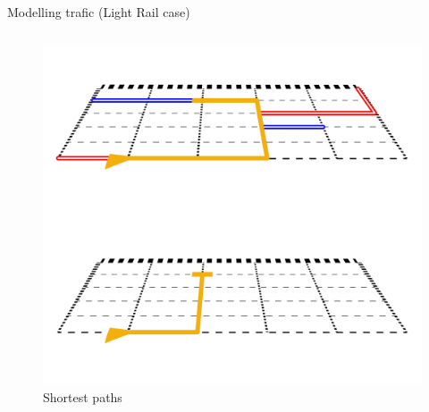 \documentclass{EESD}
\begin{document}
\begin{frame}{Modelling trafic (Light Rail case)}
\begin{columns}
\begin{figure}
{			\includegraphics[width=\textwidth]{deux_layers_1.pdf}
			\caption{Shortest paths}
			}
		\end{figure}
	\end{columns}
\end{frame}
\end{document}
